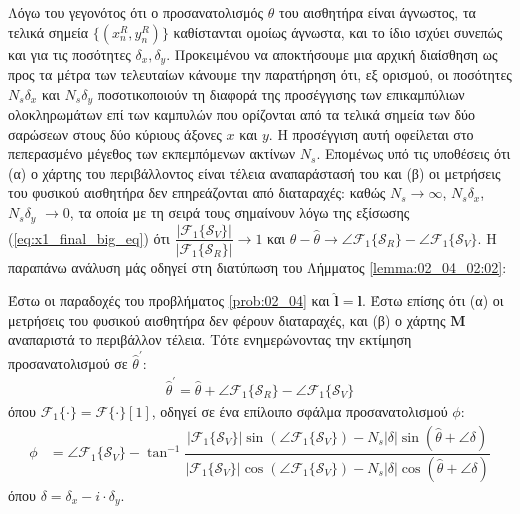 Λόγω του γεγονότος ότι ο προσανατολισμός $\theta$ του αισθητήρα είναι άγνωστος,
τα τελικά σημεία $\{(x_n^R,y_n^R)\}$ καθίστανται ομοίως άγνωστα, και το ίδιο
ισχύει συνεπώς και για τις ποσότητες $\delta_x, \delta_y$. Προκειμένου να
αποκτήσουμε μια αρχική διαίσθηση ως προς τα μέτρα των τελευταίων κάνουμε την
παρατήρηση ότι, εξ ορισμού, οι ποσότητες $N_s \delta_x$ και $N_s \delta_y$
ποσοτικοποιούν τη διαφορά της προσέγγισης των επικαμπύλιων ολοκληρωμάτων επί
των καμπυλών που ορίζονται από τα τελικά σημεία των δύο σαρώσεων στους δύο
κύριους άξονες $x$ και $y$.  Η προσέγγιση αυτή οφείλεται στο πεπερασμένο
μέγεθος των εκπεμπόμενων ακτίνων $N_s$. Επομένως υπό τις υποθέσεις ότι (α) ο
χάρτης του περιβάλλοντος είναι τέλεια αναπαράστασή του και (β) οι μετρήσεις του
φυσικού αισθητήρα δεν επηρεάζονται από διαταραχές: καθώς $N_s \rightarrow
\infty$, $N_s \delta_x$, $N_s \delta_y$ $\rightarrow 0$, τα οποία με τη σειρά
τους σημαίνουν λόγω της εξίσωσης (\ref{eq:x1_final_big_eq}) ότι
$\dfrac{|\mathcal{F}_1\{\mathcal{S}_V\}|}{|\mathcal{F}_1\{\mathcal{S}_R\}|}
\rightarrow 1$ και $\theta-\hat{\theta} \rightarrow \angle
\mathcal{F}_1\{\mathcal{S}_R\} - \angle \mathcal{F}_1\{\mathcal{S}_V\}$.  Η
παραπάνω ανάλυση μάς οδηγεί στη διατύπωση του Λήμματος \ref{lemma:02_04_02:02}:

\begin{lemma}
  \label{lemma:02_04_02:02}
  Έστω οι παραδοχές του προβλήματος \ref{prob:02_04} και $\hat{\bm{l}} = \bm{l}$.
  Έστω επίσης ότι (α) οι μετρήσεις του φυσικού αισθητήρα δεν φέρουν
  διαταραχές, και (β) ο χάρτης $\bm{M}$ αναπαριστά το περιβάλλον τέλεια. Τότε
  ενημερώνοντας την εκτίμηση προσανατολισμού σε $\hat{\theta}^\prime$:
  \begin{align}
  \hat{\theta}^\prime = \hat{\theta} + \angle \mathcal{F}_1\{\mathcal{S}_R\} - \angle\mathcal{F}_1\{\mathcal{S}_V\}
    \label{eq:update_t2}
  \end{align}
  όπου $\mathcal{F}_1\{\cdot\} = \mathcal{F}\{\cdot\} [1]$,
  οδηγεί σε ένα επίλοιπο σφάλμα προσανατολισμού $\phi$:
  \begin{align}
    \phi &= \angle \mathcal{F}_1\{\mathcal{S}_V\} - \tan^{-1}\dfrac{|\mathcal{F}_1\{\mathcal{S}_V\}| \sin(\angle \mathcal{F}_1\{\mathcal{S}_V\})-N_s |\delta| \sin(\hat{\theta} + \angle \delta)}
                                                                 {|\mathcal{F}_1\{\mathcal{S}_V\}| \cos(\angle \mathcal{F}_1\{\mathcal{S}_V\})-N_s |\delta| \cos(\hat{\theta} + \angle \delta)} \label{eq:phi2}
  \end{align}
  όπου $\delta = \delta_x - i \cdot \delta_y$.
\end{lemma}

